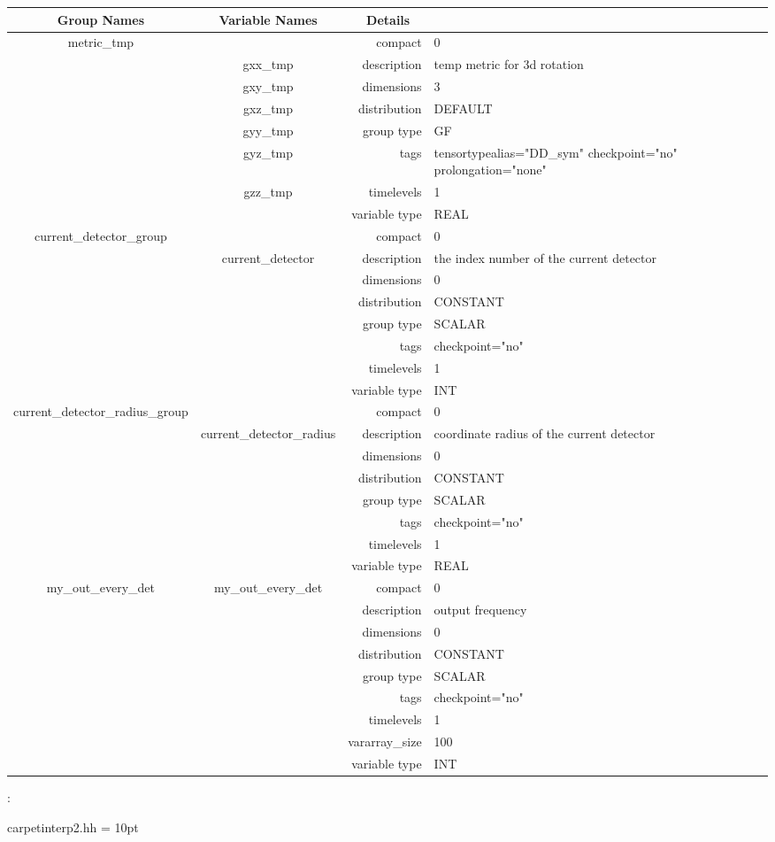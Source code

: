 \vspace{5mm}
\vspace{5mm}

\begin{tabular*}{150mm}{|c|c@{\extracolsep{\fill}}|rl|} \hline 
~ {\bf Group Names} ~ & ~ {\bf Variable Names} ~  &{\bf Details} ~ & ~ \\ 
\hline 
metric\_tmp &  & compact & 0 \\ 
 & gxx\_tmp & description & temp metric for 3d rotation \\ 
 & gxy\_tmp & dimensions & 3 \\ 
 & gxz\_tmp & distribution & DEFAULT \\ 
 & gyy\_tmp & group type & GF \\ 
 & gyz\_tmp & tags & tensortypealias="DD\_sym" checkpoint="no" prolongation="none" \\ 
 & gzz\_tmp & timelevels & 1 \\ 
 &  & variable type & REAL \\ 
\hline 
current\_detector\_group &  & compact & 0 \\ 
 & current\_detector & description & the index number of the current detector \\ 
 &  & dimensions & 0 \\ 
 &  & distribution & CONSTANT \\ 
 &  & group type & SCALAR \\ 
 &  & tags & checkpoint="no" \\ 
 &  & timelevels & 1 \\ 
 &  & variable type & INT \\ 
\hline 
current\_detector\_radius\_group &  & compact & 0 \\ 
 & current\_detector\_radius & description & coordinate radius of the current detector \\ 
 &  & dimensions & 0 \\ 
 &  & distribution & CONSTANT \\ 
 &  & group type & SCALAR \\ 
 &  & tags & checkpoint="no" \\ 
 &  & timelevels & 1 \\ 
 &  & variable type & REAL \\ 
\hline 
my\_out\_every\_det & my\_out\_every\_det & compact & 0 \\ 
 &  & description & output frequency \\ 
 &  & dimensions & 0 \\ 
 &  & distribution & CONSTANT \\ 
 &  & group type & SCALAR \\ 
 &  & tags & checkpoint="no" \\ 
 &  & timelevels & 1 \\ 
 &  & vararray\_size & 100 \\ 
 &  & variable type & INT \\ 
\hline 
\end{tabular*} 



\vspace{5mm}

: 

carpetinterp2.hh
\vspace{2mm}\parskip = 10pt 
